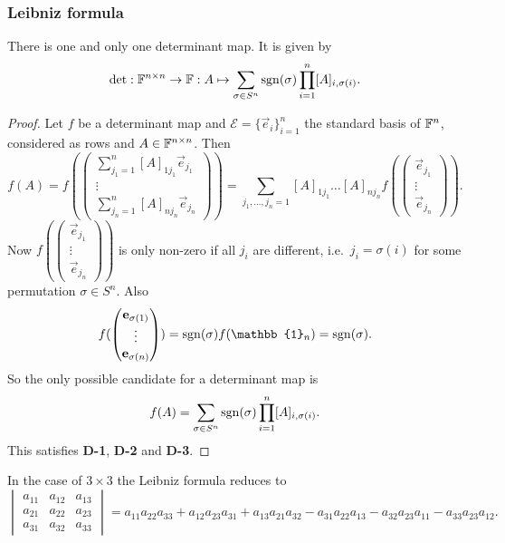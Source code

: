 \subsubsection{Leibniz formula}
\begin{proposition}
There is one and only one determinant map. It is given by
\[ \det: \mathbb{F}^{n\times n}\to \mathbb{F}: A\mapsto \sum_{\sigma\in S^n}\operatorname{sgn}(\sigma)\prod_{i=1}^n[A]_{i,\sigma(i)}. \]
\end{proposition}
\begin{proof}
Let $f$ be a determinant map and $\mathcal{E} = \{\vec{e}_i\}_{i=1}^n$ the standard basis of $\mathbb{F}^n$, considered as rows and $A\in\mathbb{F}^{n\times n}$. Then
\[ f(A) = f(\begin{pmatrix}
\sum_{j_1=1}^n [A]_{1j_1}\vec{e}_{j_1} \\ \vdots \\ \sum_{j_n=1}^n [A]_{nj_n}\vec{e}_{j_n}
\end{pmatrix}) = \sum_{j_1,\ldots, j_n=1}[A]_{1j_1}\ldots[A]_{nj_n}f(\begin{pmatrix}
\vec{e}_{j_1} \\ \vdots \\ \vec{e}_{j_n}
\end{pmatrix}). \]
Now $f(\begin{pmatrix}
\vec{e}_{j_1} \\ \vdots \\ \vec{e}_{j_n}
\end{pmatrix})$ is only non-zero if all $j_i$ are different, i.e.\ $j_i = \sigma(i)$ for some permutation $\sigma\in S^n$. Also
\[ f(\begin{pmatrix}
\vec{e}_{\sigma(1)} \\ \vdots \\ \vec{e}_{\sigma(n)}
\end{pmatrix}) = \sgn(\sigma)f(\mathbb{1}_n) = \sgn(\sigma). \]
So the only possible candidate for a determinant map is
\[ f(A) = \sum_{\sigma\in S^n}\operatorname{sgn}(\sigma)\prod_{i=1}^n[A]_{i,\sigma(i)}. \]
This satisfies \textbf{D-1}, \textbf{D-2} and \textbf{D-3}.
\end{proof}
In the case of $3\times 3$ the Leibniz formula reduces to
\[ \begin{vmatrix}
a_{11} & a_{12} & a_{13} \\
a_{21} & a_{22} & a_{23} \\
a_{31} & a_{32} & a_{33}
\end{vmatrix} = a_{11}a_{22}a_{33} + a_{12}a_{23}a_{31} + a_{13}a_{21}a_{32} - a_{31}a_{22}a_{13} - a_{32}a_{23}a_{11} - a_{33}a_{23}a_{12}. \]
